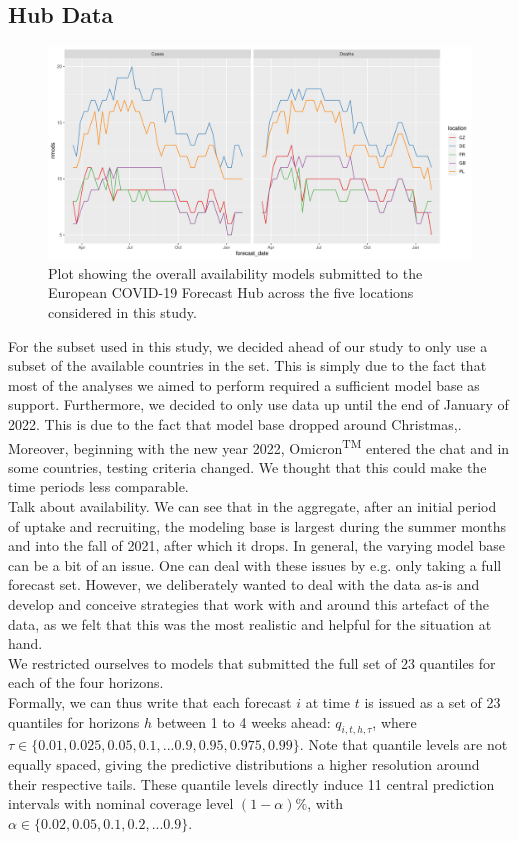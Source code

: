 \subsection{Hub Data} \label{sub:hub_data}
\begin{figure}
\includegraphics[width = \textwidth]{../plots/availability_all.pdf}
\caption{Plot showing the overall availability models submitted to the European COVID-19 Forecast Hub across the five locations considered in this study.}
\end{figure}
For the subset used in this study, we decided ahead of our study to only use a subset of the available countries in the set. This is simply due to the fact that most of the analyses we aimed to perform required a sufficient model base as support. Furthermore, we decided to only use data up until the end of January of 2022. This is due to the fact that model base dropped around Christmas,. Moreover, beginning with the new year 2022, Omicron\textsuperscript{TM} entered the chat and in some countries, testing criteria changed. We thought that this could make the time periods less comparable.\\
Talk about availability. We can see that in the aggregate, after an initial period of uptake and recruiting, the modeling base is largest during the summer months and into the fall of 2021, after which it drops.
In general, the varying model base can be a bit of an issue. One can deal with these issues by e.g. only taking a full forecast set. However, we deliberately wanted to deal with the data as-is and develop and conceive strategies that work with and around this artefact of the data, as we felt that this was the most realistic and helpful for the situation at hand. \\
We restricted ourselves to models that submitted the full set of 23 quantiles for each of the four horizons.\\
Formally, we can thus write that each forecast $i$ at time $t$ is issued as a set of 23 quantiles for horizons $h$ between 1 to 4 weeks ahead: $q_{i, t, h, \tau}$, where $\tau \in \{0.01, 0.025, 0.05, 0.1, ... 0.9, 0.95, 0.975, 0.99\} $. Note that quantile levels are not equally spaced, giving the predictive distributions a higher resolution around their respective tails. These quantile levels directly induce 11 central prediction intervals with nominal coverage level $(1-\alpha)\%$, with $\alpha \in \{0.02, 0.05, 0.1, 0.2, ... 0.9\}$.\\
